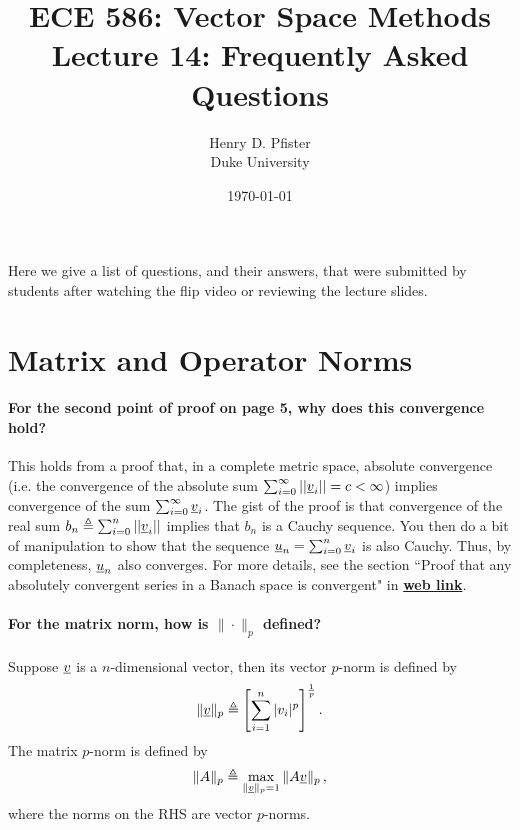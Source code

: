 \documentclass[10pt,english]{article}
\begin{document}
\title{ECE 586: Vector Space Methods \\ Lecture 14: Frequently Asked Questions}
\author{Henry D. Pfister \\ Duke University}
\date{\today}

\maketitle

Here we give a list of questions, and their answers, that were submitted by students after watching the flip video or reviewing the lecture slides.

\section{Matrix and Operator Norms}

\paragraph{For the second point of proof on page 5, why does this convergence hold?}
This holds from a proof that, in a complete metric space, absolute convergence (i.e. the convergence of the absolute sum $\sum_{i=0}^\infty ||\underline{v}_i|| = c <\infty $) implies convergence of the sum $ \sum_{i=0}^\infty \underline{v}_i$. The gist of the proof is that convergence of the real sum $b_n \triangleq \sum_{i=0}^n ||\underline{v}_i|| $ implies that $b_n$ is a Cauchy sequence. You then do a bit of manipulation to show that the sequence $\underline{u}_n = \sum_{i=0}^n \underline{v}_i$ is also Cauchy.
Thus, by completeness, $\underline{u}_n$ also converges.
For more details, see the section
``Proof that any absolutely convergent series in a Banach space is convergent" in 
\href{https://en.wikipedia.org/wiki/Absolute_convergence}{\textbf{web link}}.

\paragraph{For the matrix norm, how is $\| \cdot \|_p$ defined?}
Suppose $\underline{v}$ is a $n$-dimensional vector, then its vector $p$-norm is defined by
$$\| \underline{v} \|_p \triangleq \left[\sum_{i=1}^n |v_i|^p \right]^{\frac1p}.$$
The matrix $p$-norm is defined by 
$$\| A \|_p \triangleq \max_{\|\underline{v}\|_p = 1} \|A \underline{v} \|_p \, , $$
where the norms on the RHS are vector $p$-norms.
\end{document}
